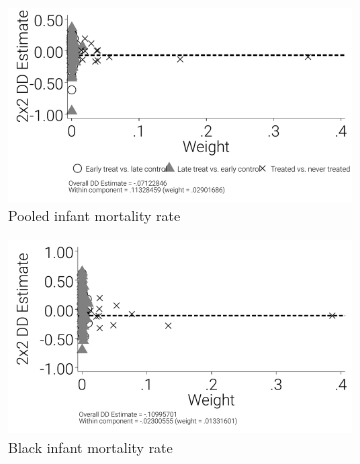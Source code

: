 \documentclass[12pt]{article}
\begin{document}
\begin{figure}
    \caption[\cite{GB2019} decomposition diagnostic]{\cite{GB2019} decomposition diagnostic}
    \centering
    \begin{subfigure}{0.48\textwidth}
        \centering
        \includegraphics[width=\linewidth]{../analysis/output/appendix/figure_i1a_bacon_decomp_diagnostic.pdf}
        \caption[Pooled infant mortality rate]{Pooled infant mortality rate}
        \label{fig:bacon-decomp-pooled}
    \end{subfigure}
    \begin{subfigure}{0.48\textwidth}
        \centering
        \includegraphics[width=\linewidth]{../analysis/output/appendix/figure_i1b_bacon_decomp_diagnostic_bk.pdf}
        \caption[Black infant mortality rate]{Black infant mortality rate}
        \label{fig:bacon-decomp-black}
    \end{subfigure}
    \begin{subfigure}{0.48\textwidth}
        \centering

\end{subfigure}
\end{figure}
\end{document}
